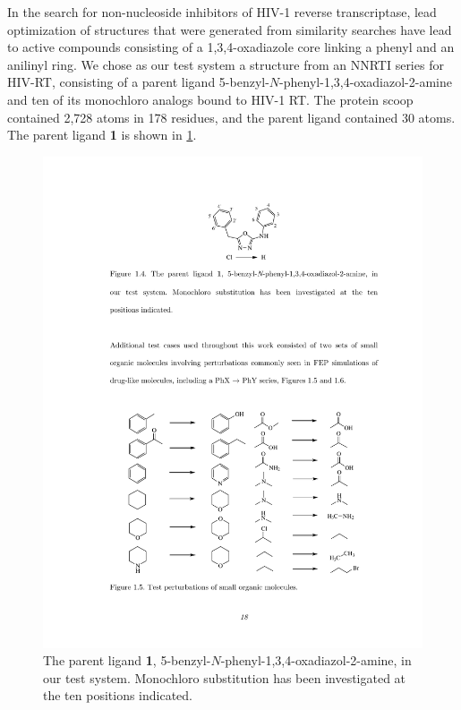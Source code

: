 \documentclass[12pt]{report}
\begin{document}
In the search for non-nucleoside inhibitors of HIV-1 reverse transcriptase, lead optimization of structures that were generated from similarity searches have lead to active compounds consisting of a 1,3,4-oxadiazole core linking a phenyl and an anilinyl ring.\cite{barreiro1, barreiro2} We chose as our test system a structure from an NNRTI series for HIV-RT, consisting of a parent ligand 5-benzyl-$N$-phenyl-1,3,4-oxadiazol-2-amine and ten of its monochloro analogs bound to HIV-1 RT. The protein scoop contained 2,728 atoms in 178 residues, and the parent ligand contained 30 atoms. The parent ligand \textbf{1} is shown in \cref{parent}. 

\begin{figure}
\centering
\includegraphics[scale=0.99]{figures/pdf/parent.pdf}
\caption{The parent ligand \textbf{1}, 5-benzyl-$N$-phenyl-1,3,4-oxadiazol-2-amine, in our test system. Monochloro substitution has been investigated at the ten positions indicated.}
\label{parent}
\end{figure}
\end{document}
